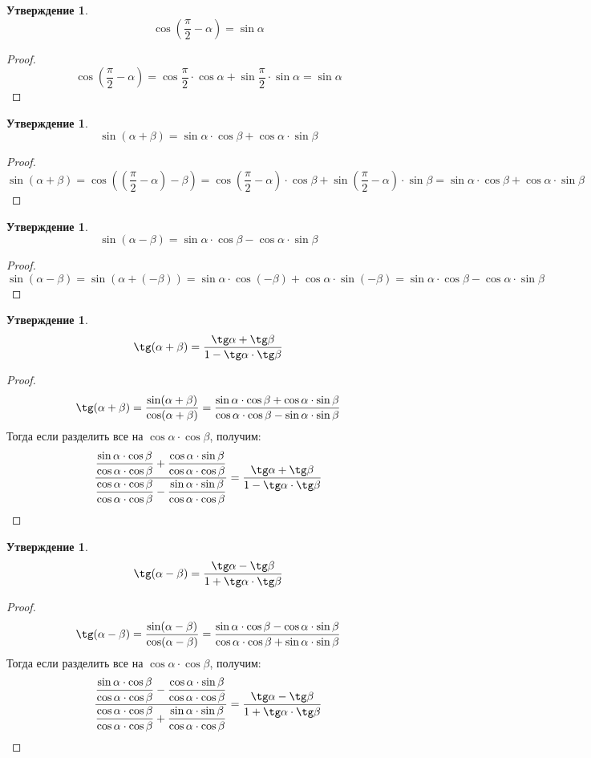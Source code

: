 \documentclass[12pt]{article}
\theoremstyle{definition}
\newtheorem{statement}[theorem]{Утверждение}
\begin{document}
    \begin{statement}
        $$\cos\left(\dfrac{\pi}{2}-\alpha\right)=\sin \alpha$$
    \end{statement}
    \begin{proof}
        $$\cos\left(\dfrac{\pi}{2}-\alpha\right)=\cos\dfrac{\pi}{2}\cdot\cos\alpha+\sin\dfrac{\pi}{2}\cdot\sin\alpha=\sin\alpha$$
    \end{proof}
    \begin{statement}
        $$\sin(\alpha+\beta)=\sin\alpha\cdot\cos\beta+\cos\alpha\cdot\sin\beta$$
    \end{statement}
    \begin{proof}
        $$\sin(\alpha+\beta)=\cos\left(\left(\dfrac{\pi}{2}-\alpha\right)-\beta\right)=\cos\left(\dfrac{\pi}{2}-\alpha\right)\cdot \cos \beta+\sin\left(\dfrac{\pi}{2}-\alpha\right)\cdot \sin \beta=\sin\alpha\cdot\cos\beta+\cos\alpha\cdot\sin\beta$$
    \end{proof}
    \begin{statement}
        $$\sin(\alpha-\beta)=\sin\alpha\cdot\cos\beta-\cos\alpha\cdot\sin\beta$$
    \end{statement}
    \begin{proof}
        $$\sin(\alpha-\beta)=\sin(\alpha+(-\beta))=\sin\alpha\cdot\cos(-\beta)+\cos\alpha\cdot\sin(-\beta)=\sin\alpha\cdot\cos\beta-\cos\alpha\cdot\sin\beta$$
    \end{proof}
    \begin{statement}
        $$\tg(\alpha+\beta)=\dfrac{\tg\alpha+\tg\beta}{1-\tg\alpha\cdot\tg\beta}$$
    \end{statement}
    \begin{proof}
        $$\tg(\alpha+\beta)=\dfrac{\sin(\alpha+\beta)}{\cos(\alpha+\beta)}=\dfrac{\sin\alpha\cdot\cos\beta+\cos\alpha\cdot\sin\beta}{\cos\alpha\cdot\cos\beta-\sin\alpha\cdot\sin\beta}$$
        Тогда если разделить все на $\cos\alpha\cdot\cos\beta$, получим:
        $$\dfrac{\dfrac{\sin\alpha\cdot\cos\beta}{\cos\alpha\cdot\cos\beta}+\dfrac{\cos\alpha\cdot\sin\beta}{\cos\alpha\cdot\cos\beta}}{\dfrac{\cos\alpha\cdot\cos\beta}{\cos\alpha\cdot\cos\beta}-\dfrac{\sin\alpha\cdot\sin\beta}{\cos\alpha\cdot\cos\beta}}=\dfrac{\tg\alpha+\tg\beta}{1-\tg\alpha\cdot\tg\beta}$$
    \end{proof}
    \begin{statement}
        $$\tg(\alpha-\beta)=\dfrac{\tg\alpha-\tg\beta}{1+\tg\alpha\cdot\tg\beta}$$
    \end{statement}
    \begin{proof}
        $$\tg(\alpha-\beta)=\dfrac{\sin(\alpha-\beta)}{\cos(\alpha-\beta)}=\dfrac{\sin\alpha\cdot\cos\beta-\cos\alpha\cdot\sin\beta}{\cos\alpha\cdot\cos\beta+\sin\alpha\cdot\sin\beta}$$
        Тогда если разделить все на $\cos\alpha\cdot\cos\beta$, получим:
        $$\dfrac{\dfrac{\sin\alpha\cdot\cos\beta}{\cos\alpha\cdot\cos\beta}-\dfrac{\cos\alpha\cdot\sin\beta}{\cos\alpha\cdot\cos\beta}}{\dfrac{\cos\alpha\cdot\cos\beta}{\cos\alpha\cdot\cos\beta}+\dfrac{\sin\alpha\cdot\sin\beta}{\cos\alpha\cdot\cos\beta}}=\dfrac{\tg\alpha-\tg\beta}{1+\tg\alpha\cdot\tg\beta}$$
    \end{proof}
\end{document}
